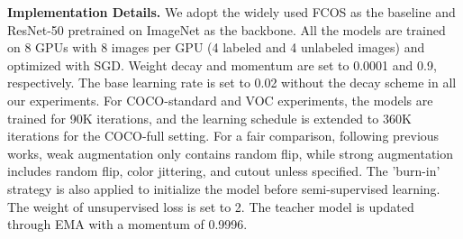 \documentclass[10pt,twocolumn,letterpaper]{article}
\begin{document}
\noindent\textbf{Implementation Details.}
We adopt the widely used FCOS\cite{Fcos} as the baseline and ResNet-50\cite{ResNet} pretrained on ImageNet\cite{Imagenet} as the backbone.
All the models are trained on 8 GPUs with 8 images per GPU (4 labeled and 4 unlabeled images) and optimized with SGD.
Weight decay and momentum are set to 0.0001 and 0.9, respectively.
The base learning rate is set to 0.02 without the decay scheme in all our experiments.
For COCO-standard and VOC experiments, the models are trained for 90K iterations, and the learning schedule is extended to 360K iterations for the COCO-full setting.
For a fair comparison, following previous works, weak augmentation only contains random flip, while strong augmentation includes random flip, color jittering, and cutout unless specified.
The 'burn-in' strategy is also applied to initialize the model before semi-supervised learning.
The weight of unsupervised loss is set to 2.
The teacher model is updated through EMA with a momentum of 0.9996.


\begin{table}[t]
\setlength{\belowcaptionskip}{-10pt}
    \caption{Experimental results on COCO-Full. Note that  indicates  training iterations, and  is  iterations.}
    \centering
    \label{table3}
\end{table}
\end{document}
